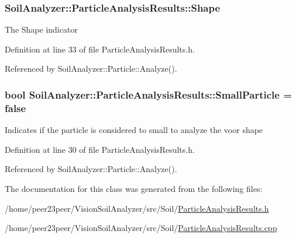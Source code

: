 \subsubsection[{Shape}]{ Soil\+Analyzer\+::\+Particle\+Analysis\+Results\+::\+Shape}\label{class_soil_analyzer_1_1_particle_analysis_results_a75230aa0675b2df489c08bcfffb43b97}
The Shape indicator 

Definition at line 33 of file Particle\+Analysis\+Results.\+h.



Referenced by Soil\+Analyzer\+::\+Particle\+::\+Analyze().

\hypertarget{class_soil_analyzer_1_1_particle_analysis_results_a8aaa7f053d68bce6f1ad2b7bcd30cd95}{}
\subsubsection[{Small\+Particle}]{\setlength{\rightskip}{0pt plus 5cm}bool Soil\+Analyzer\+::\+Particle\+Analysis\+Results\+::\+Small\+Particle = false}\label{class_soil_analyzer_1_1_particle_analysis_results_a8aaa7f053d68bce6f1ad2b7bcd30cd95}
Indicates if the particle is considered to small to analyze the voor shape 

Definition at line 30 of file Particle\+Analysis\+Results.\+h.



Referenced by Soil\+Analyzer\+::\+Particle\+::\+Analyze().



The documentation for this class was generated from the following files\+:\begin{DoxyCompactItemize}
\item 
/home/peer23peer/\+Vision\+Soil\+Analyzer/src/\+Soil/\hyperlink{_particle_analysis_results_8h}{Particle\+Analysis\+Results.\+h}\item 
/home/peer23peer/\+Vision\+Soil\+Analyzer/src/\+Soil/\hyperlink{_particle_analysis_results_8cpp}{Particle\+Analysis\+Results.\+cpp}\end{DoxyCompactItemize}
